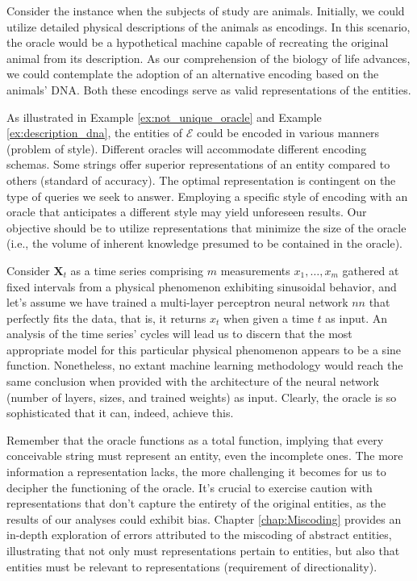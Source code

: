 \begin{example}
\label{ex:description_dna}
Consider the instance when the subjects of study are animals. Initially, we could utilize detailed physical descriptions of the animals as encodings. In this scenario, the oracle would be a hypothetical machine capable of recreating the original animal from its description. As our comprehension of the biology of life advances, we could contemplate the adoption of an alternative encoding based on the animals' DNA. Both these encodings serve as valid representations of the entities.
\end{example}

As illustrated in Example \ref{ex:not_unique_oracle} and Example \ref{ex:description_dna}, the entities of $\mathcal{E}$ could be encoded in various manners (problem of style). Different oracles will accommodate different encoding schemas. Some strings offer superior representations of an entity compared to others (standard of accuracy). The optimal representation is contingent on the type of queries we seek to answer. Employing a specific style of encoding with an oracle that anticipates a different style may yield unforeseen results. Our objective should be to utilize representations that minimize the size of the oracle (i.e., the volume of inherent knowledge presumed to be contained in the oracle).

\begin{example}
Consider $\mathbf{X}_t$ as a time series comprising $m$ measurements $x_1, \ldots, x_m$ gathered at fixed intervals from a physical phenomenon exhibiting sinusoidal behavior, and let's assume we have trained a multi-layer perceptron neural network $nn$ that perfectly fits the data, that is, it returns $x_t$ when given a time $t$ as input. An analysis of the time series' cycles will lead us to discern that the most appropriate model for this particular physical phenomenon appears to be a sine function. Nonetheless, no extant machine learning methodology would reach the same conclusion when provided with the architecture of the neural network (number of layers, sizes, and trained weights) as input. Clearly, the oracle is so sophisticated that it can, indeed, achieve this.
\end{example}

Remember that the oracle functions as a total function, implying that every conceivable string must represent an entity, even the incomplete ones. The more information a representation lacks, the more challenging it becomes for us to decipher the functioning of the oracle. It's crucial to exercise caution with representations that don't capture the entirety of the original entities, as the results of our analyses could exhibit bias. Chapter \ref{chap:Miscoding} provides an in-depth exploration of errors attributed to the miscoding of abstract entities, illustrating that not only must representations pertain to entities, but also that entities must be relevant to representations (requirement of directionality).


